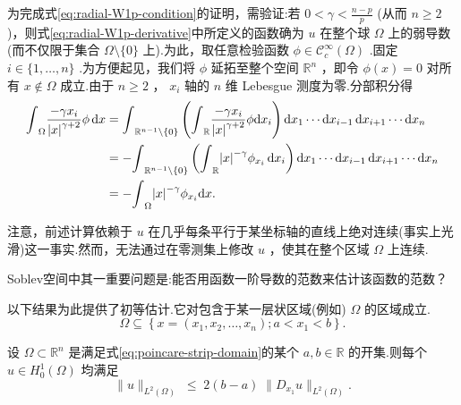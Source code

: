 \begin{instance}
为完成式\eqref{eq:radial-W1p-condition}的证明，需验证:若 $0 < \gamma  < \frac{n - p}{p}$ (从而 $n \geq  2$ )，则式\eqref{eq:radial-W1p-derivative}中所定义的函数确为 $u$ 在整个球 $\Omega$ 上的弱导数(而不仅限于集合 $\Omega  \setminus  \{ 0\}$ 上).为此，取任意检验函数 $\phi  \in  {\mathcal{C}}_{c}^{\infty }\left( \Omega \right)$ .固定 $i \in  \{ 1,\ldots ,n\}$ .为方便起见，我们将 $\phi$ 延拓至整个空间 ${\mathbb{R}}^{n}$ ，即令 $\phi \left( x\right)  = 0$ 对所有 $x \notin  \Omega$ 成立.由于 $n \geq  2$ ， ${x}_{i}$ 轴的 $n$ 维 Lebesgue 测度为零.分部积分得
{\setjot[-2]\begin{align*}
    {\int }_{\Omega }\frac{-\gamma {x}_{i}}{{\left| x\right| }^{\gamma  + 2}}{\phi \d x} &= {\int }_{{\mathbb{R}}^{n - 1}\setminus \{ 0\} }\left( {{\int }_{\mathbb{R}}\frac{-\gamma {x}_{i}}{{\left| x\right| }^{\gamma  + 2}}\phi {\d x_{i}}}\right) \d x_{1}\cdots \d x_{i - 1}\d x_{i + 1}\cdots \d x_{n}\\
    &=  - {\int }_{{\mathbb{R}}^{n - 1}\setminus \{ 0\} }\left( {{\int }_{\mathbb{R}}{\left| x\right| }^{-\gamma }{\phi }_{{x}_{i}}\d x_{i}}\right) \d x_{1}\cdots \d x_{i - 1}\d x_{i + 1}\cdots \d x_{n}\\
    &=  - {\int }_{\Omega }{\left| x\right| }^{-\gamma }{\phi }_{{x}_{i}}{\d x}.
\end{align*}}


注意，前述计算依赖于 $u$ 在几乎每条平行于某坐标轴的直线上绝对连续(事实上光滑)这一事实.然而，无法通过在零测集上修改 $u$ ，使其在整个区域 $\Omega$ 上连续.
\end{instance}

Soblev空间中其一重要问题是:能否用函数一阶导数的范数来估计该函数的范数？ \par
以下结果为此提供了初等估计.它对包含于某一层状区域(例如) $\Omega$ 的区域成立.
\begin{equation}\tag{8.29}\label{eq:poincare-strip-domain}
\Omega  \subseteq  \left\{  {x = \left( {{x}_{1},{x}_{2},\ldots ,{x}_{n}}\right) ;a < {x}_{1} < b}\right\}  .
\end{equation}

\begin{theorem}[Poincaré不等式，I]\label{thm:poincare-inequality-I}
设 $\Omega  \subset  {\mathbb{R}}^{n}$ 是满足式\eqref{eq:poincare-strip-domain}的某个 $a,b \in  \mathbb{R}$ 的开集.则每个 $u \in  {H}_{0}^{1}\left( \Omega \right)$ 均满足
\begin{equation}\tag{8.30}\label{eq:poincare-inequality-I}
\| u{\| }_{{L}^{2}\left( \Omega \right) }\; \leq  \;2\left( {b - a}\right) \;\| {D}_{{x}_{1}}u{\| }_{{L}^{2}\left( \Omega \right) }.
\end{equation}
\end{theorem}

